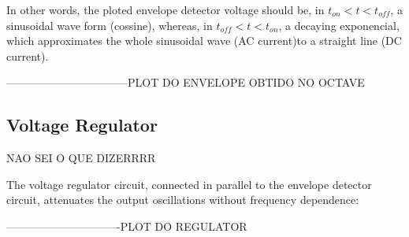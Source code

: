 In other words, the ploted envelope detector voltage should be, in $t_{on} < t < t_{off}$, a sinusoidal wave form (cossine), whereas, in $t_{off} < t < t_{on}$, a decaying exponencial, which approximates the whole sinusoidal wave (AC current)to a straight line (DC current).


---------------------------------PLOT DO ENVELOPE OBTIDO NO OCTAVE

\subsection{Voltage Regulator}

NAO SEI O QUE DIZERRRR

The voltage regulator circuit, connected in parallel to the envelope detector circuit, attenuates the output oscillations without frequency dependence:

-------------------------------PLOT DO REGULATOR



